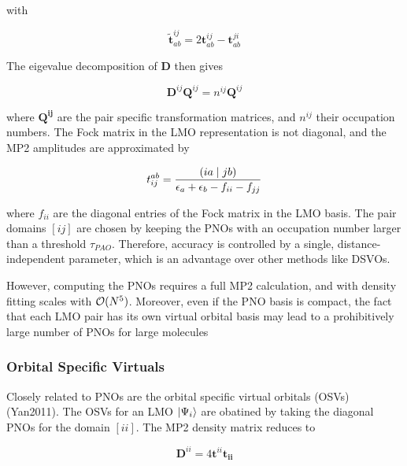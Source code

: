 \noindent with 

\begin{equation}
\mathbf{\tilde{t}}^{ij}_{ab} = 2 \mathbf{t}^{ij}_{ab} - \mathbf{t}^{ji}_{ab} 
\end{equation}

\noindent The eigevalue decomposition of $\mathbf{D}$ then gives

\begin{equation}
\mathbf{D}^{ij} \mathbf{Q}^{ij} = n^{ij} \mathbf{Q}^{ij} 
\end{equation}

\noindent where $\mathbf{Q^{ij}}$ are the pair specific transformation matrices, and $n^{ij}$ their occupation numbers. The Fock matrix in the LMO representation is not diagonal, and the MP2 amplitudes are approximated by

\begin{equation}
t_{ij}^{ab} = \frac{\left( ia \mid jb \right)}{\epsilon_a + \epsilon_b - f_{ii} - f_{jj}}
\end{equation}

\noindent where $f_{ii}$ are the diagonal entries of the Fock matrix in the LMO basis. The pair domains $[ij]$ are chosen by keeping the PNOs with an occupation number larger than a threshold $\tau_{PAO}$. Therefore, accuracy is controlled by a single, distance-independent parameter, which is an advantage over other methods like DSVOs. 

However, computing the PNOs requires a full MP2 calculation, and with density fitting scales with $\mathcal{O}(N^{5})$. Moreover, even if the PNO basis is compact, the fact that each LMO pair has its own virtual orbital basis may lead to a prohibitively large number of PNOs for large molecules 


\subsubsection*{Orbital Specific Virtuals}

Closely related to PNOs are the orbital specific virtual orbitals (OSVs) (Yan2011). The OSVs for an LMO $\ket{\Psi_i}$ are obatined by taking the diagonal PNOs for the domain $[ii]$. The MP2 density matrix reduces to

\begin{equation}
\mathbf{D}^{ii} = 4 \mathbf{t}^{ii} \mathbf{t_{ii}}
\end{equation}

